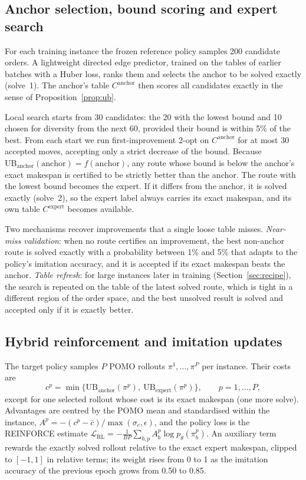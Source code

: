 \documentclass[preprint,review,12pt,authoryear]{elsarticle}
\newcommand{\UB}{\mathrm{UB}}
\begin{document}
\subsection{Anchor selection, bound scoring and expert search}\label{sec:expert}
For each training instance the frozen reference policy samples 200 candidate orders. A lightweight directed
edge predictor, trained on the tables of earlier batches with a Huber loss, ranks them and selects the anchor
to be solved exactly (solve~1). The anchor's table $C^{\text{anchor}}$ then scores all candidates exactly in
the sense of Proposition~\ref{prop:ub}.

Local search starts from 30 candidates: the 20 with the lowest bound and 10 chosen for diversity from the next
60, provided their bound is within 5\% of the best. From each start we run first-improvement 2-opt on
$C^{\text{anchor}}$ for at most 30 accepted moves, accepting only a strict decrease of the bound. Because
$\UB_{\text{anchor}}(\text{anchor})=f(\text{anchor})$, any route whose bound is below the anchor's exact makespan is
certified to be strictly better than the anchor. The route with the lowest bound becomes the expert. If it
differs from the anchor, it is solved exactly (solve~2), so the expert label always carries its exact
makespan, and its own table $C^{\text{expert}}$ becomes available.

Two mechanisms recover improvements that a single loose table misses. \emph{Near-miss validation}: when no
route certifies an improvement, the best non-anchor route is solved exactly with a probability between 1\% and
5\% that adapts to the policy's imitation accuracy, and it is accepted if its exact makespan beats the anchor.
\emph{Table refresh}: for large instances later in training (Section~\ref{sec:recipe}), the search is repeated
on the table of the latest solved route, which is tight in a different region of the order space, and the best
unsolved result is solved and accepted only if it is exactly better.

\subsection{Hybrid reinforcement and imitation updates}
The target policy samples $P$ POMO rollouts $\pi^{1},\dots,\pi^{P}$ per instance. Their costs are
\begin{equation}
c^{p}=\min\{\UB_{\text{anchor}}(\pi^{p}),\ \UB_{\text{expert}}(\pi^{p})\},\qquad p=1,\dots,P,
\end{equation}
except for one selected rollout whose cost is its exact makespan (one more solve). Advantages are centred by
the POMO mean and standardised within the instance,
$A^{p}=-(c^{p}-\bar c)/\max(\sigma_c,\epsilon)$, and the policy loss is the REINFORCE estimate
$\mathcal L_{\mathrm{RL}}=-\frac{1}{BP}\sum_{b,p}A^{p}_b\log p_\theta(\pi^{p}_b)$. An auxiliary term rewards the
exactly solved rollout relative to the exact expert makespan, clipped to $[-1,1]$ in relative terms; its weight
rises from 0 to 1 as the imitation accuracy of the previous epoch grows from 0.50 to 0.85.
\end{document}
